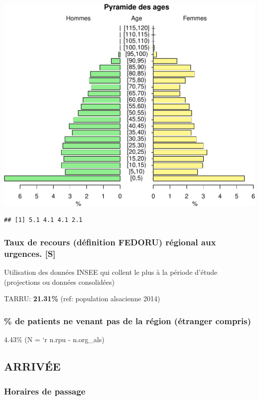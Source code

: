 \documentclass[]{article}
\begin{document}
\includegraphics{rapport2014_V4_files/figure-latex/pyramide-1.pdf}

\begin{verbatim}
## [1] 5.1 4.1 4.1 2.1
\end{verbatim}

\subsubsection{Taux de recours (définition FEDORU) régional aux
urgences.
{[}S{]}}\label{taux-de-recours-definition-fedoru-regional-aux-urgences.-s}

Utilisation des données INSEE qui collent le plus à la période d'étude
(projections ou données consolidées)

TARRU: \textbf{21.31\%} (ref: population alsacienne 2014)

\subsubsection{\% de patients ne venant pas de la région (étranger
compris)}\label{de-patients-ne-venant-pas-de-la-region-etranger-compris}

4.43\% (N = `r n.rpu - n.org\_als)

\subsection{ARRIVÉE}\label{arrivee}

\subsubsection{Horaires de passage}\label{horaires-de-passage}
\end{document}
